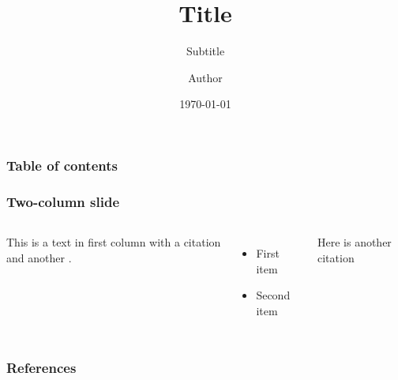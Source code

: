\documentclass{beamer}
\title[Title]{Title}
\subtitle{Subtitle}
\author[Author]{Author}
\institute{Institution}
\date{\today}
\begin{document}
\frame{\titlepage}

\begin{frame}
	\frametitle{Table of contents}
	\tableofcontents
\end{frame}

\begin{frame}
\frametitle{Two-column slide}
\begin{columns}
	
	This is a text in first column with a citation \citet{einstein} and another \citep{dirac}.
	\begin{itemize}
		\item First item
		\item Second item
	\end{itemize}
	
	Here is another citation \citep{knuth-fa}
\end{columns}
\end{frame}
\begin{frame}
  \frametitle{References}
  
  
\end{frame}
\end{document}
